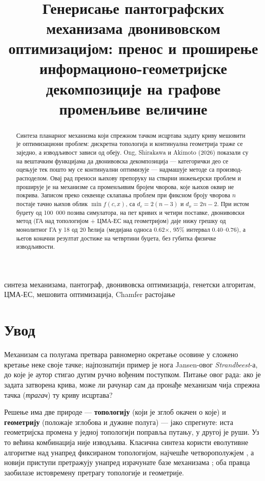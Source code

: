 \documentclass[
  conference,
  a4paper,
  10pt]{IEEEtran}
\title{\makebox[\textwidth][l]{\normalfont\normalsize IEEESTEC -- Student Projects Conference, Ni\v{s}, 2026.}\\[-2pt]\makebox[\textwidth][l]{\normalfont\footnotesize https://doi.org/ (организатор додаје број)}\\[-2pt]\makebox[\textwidth][l]{\normalfont\footnotesize Original scientific paper}\\[6pt] Генерисање пантографских механизама двонивовском оптимизацијом:
пренос и проширење информационо-геометријске декомпозиције на графове
променљиве величине}
\author{\IEEEauthorblockN{Никола Најић}\IEEEauthorblockA{Истраживачка станица Петница\\ Ваљево, Србија\\ nnajic1@gmail.com, ORCID: N/A}
\and
\IEEEauthorblockN{Бранислав Милојковић}\IEEEauthorblockA{Истраживачка станица Петница\\ Ваљево, Србија\\ branislav.milojkovic@petnica.rs}}
\date{}
\begin{document}
\maketitle
\begin{abstract}
Синтеза планарног механизма који спрежном тачком исцртава задату криву
мешовити је оптимизациони проблем: дискретна топологија и континуална
геометрија траже се заједно, а изводљивост зависи од обеју. Ong,
Shirakawa и Akimoto (2026) показали су на вештачким функцијама да
двонивовска декомпозиција --- категорички део се оцењује тек пошто му се
континуални оптимизује --- надмашује методе са производ-расподелом. Овај
рад преноси њихову препоруку на стварни инжењерски проблем и проширује
је на механизме са променљивим бројем чворова, које њихов оквир не
покрива. Записом преко секвенце склапања проблем при фиксном броју
чворова \(n\) постаје тачно њихов облик \(\min f(c,x)\), са
\(d_c = 2(n-3)\) и \(d_x = 2n-2\). При истом буџету од 100~000 позива
симулатора, на пет кривих и четири поставке, двонивовски метод (ГА над
топологијом + ЦМА-ЕС над геометријом) даје нижу грешку од монолитног ГА
у 18 од 20 ћелија (медијана односа 0.62×, 95\% интервал 0.40--0.76), а
његов коначни резултат достиже на четвртини буџета, без губитка физичке
изводљивости.
\end{abstract}
\begin{IEEEkeywords}
синтеза механизама, пантограф, двонивовска оптимизација, генетски алгоритам, ЦМА-ЕС, мешовита оптимизација, Chamfer растојање
\end{IEEEkeywords}

\hypertarget{ux443ux432ux43eux434}{%
\section{Увод}\label{ux443ux432ux43eux434}}

Механизам са полугама претвара равномерно окретање осовине у сложено
кретање неке своје тачке; најпознатији пример је нога Jansen-овог
\emph{Strandbeest}-а, до које је аутор стигао дугим ручно вођеним
поступком. Питање овог рада: ако је задата затворена крива, може ли
рачунар сам да пронађе механизам чија спрежна тачка (\emph{трагач}) ту
криву исцртава?

Решење има две природе --- \textbf{топологију} (који је зглоб окачен о
које) и \textbf{геометрију} (положаје зглобова и дужине полуга) --- јако
спрегнуте: иста геометријска промена у једној топологији поправља
путању, у другој је руши. Уз то већина комбинација није изводљива.
Класична синтеза користи еволутивне алгоритме над унапред фиксираном
топологијом, најчешће четворополужјем \citep{cabrera, sleesongsom}, а
новији приступи претражују унапред израчунате базе механизама
\citep{link, tang}; оба правца заобилазе истовремену претрагу топологије
и геометрије.
\end{document}
